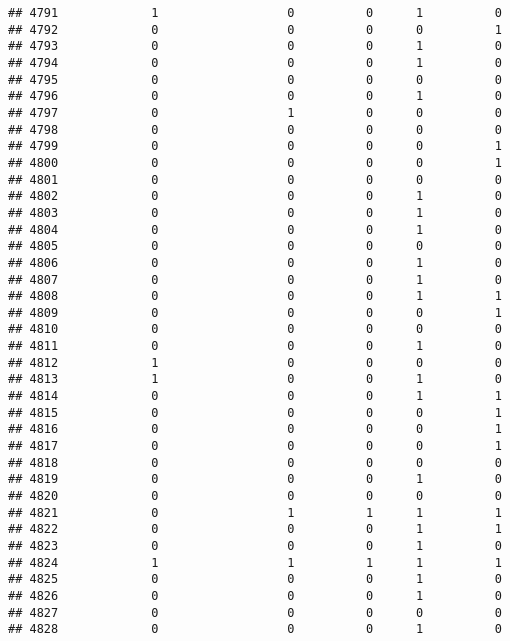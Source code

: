 \documentclass[
]{article}
\begin{document}
\begin{verbatim}
## 4791             1                  0          0      1          0
## 4792             0                  0          0      0          1
## 4793             0                  0          0      1          0
## 4794             0                  0          0      1          0
## 4795             0                  0          0      0          0
## 4796             0                  0          0      1          0
## 4797             0                  1          0      0          0
## 4798             0                  0          0      0          0
## 4799             0                  0          0      0          1
## 4800             0                  0          0      0          1
## 4801             0                  0          0      0          0
## 4802             0                  0          0      1          0
## 4803             0                  0          0      1          0
## 4804             0                  0          0      1          0
## 4805             0                  0          0      0          0
## 4806             0                  0          0      1          0
## 4807             0                  0          0      1          0
## 4808             0                  0          0      1          1
## 4809             0                  0          0      0          1
## 4810             0                  0          0      0          0
## 4811             0                  0          0      1          0
## 4812             1                  0          0      0          0
## 4813             1                  0          0      1          0
## 4814             0                  0          0      1          1
## 4815             0                  0          0      0          1
## 4816             0                  0          0      0          1
## 4817             0                  0          0      0          1
## 4818             0                  0          0      0          0
## 4819             0                  0          0      1          0
## 4820             0                  0          0      0          0
## 4821             0                  1          1      1          1
## 4822             0                  0          0      1          1
## 4823             0                  0          0      1          0
## 4824             1                  1          1      1          1
## 4825             0                  0          0      1          0
## 4826             0                  0          0      1          0
## 4827             0                  0          0      0          0
## 4828             0                  0          0      1          0

\end{verbatim}
\end{document}
